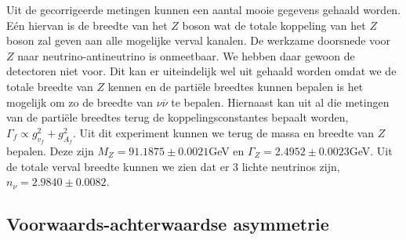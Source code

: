 \documentclass[../main.tex]{subfiles}
\begin{document}
Uit de gecorrigeerde metingen kunnen een aantal mooie gegevens gehaald worden. Eén hiervan is de breedte van het $Z$ boson wat de totale koppeling van het $Z$ boson zal geven aan alle mogelijke verval kanalen. De werkzame doorsnede voor $Z$ naar neutrino-antineutrino is onmeetbaar. We hebben daar gewoon de detectoren niet voor. Dit kan er uiteindelijk wel uit gehaald worden omdat we de totale breedte van $Z$ kennen en de partiële breedtes kunnen bepalen is het mogelijk om zo de breedte van $\nu\overline \nu$ te bepalen. Hiernaast kan uit al die metingen van de partiële breedtes terug de koppelingsconstantes bepaalt worden, $\Gamma_f \propto g_{v_f}^2+g_{A_f}^2$. Uit dit experiment kunnen we terug de massa en breedte van $Z$ bepalen. Deze zijn $M_Z = 91.1875 \pm 0.0021$GeV en $\Gamma_Z = 2.4952 \pm 0.0023$GeV. Uit de totale verval breedte kunnen we zien dat er 3 lichte neutrinos zijn, $n_\nu = 2.9840 \pm 0.0082$.

\subsection{Voorwaards-achterwaardse asymmetrie}%
\label{sub:voorwaards_achterwaardse_asymmetrie}
\end{document}
